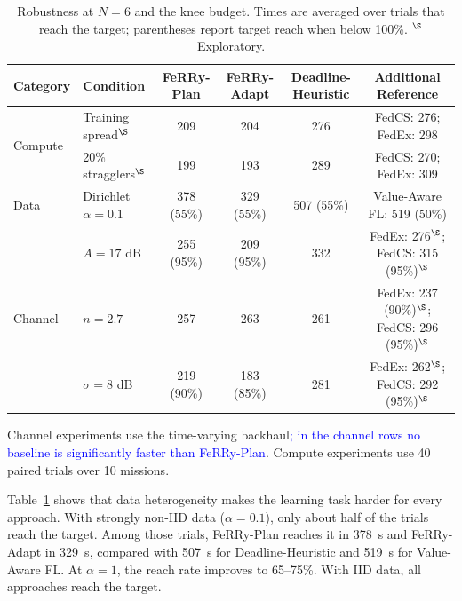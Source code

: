 \documentclass[conference]{IEEEtran}
\newcommand{\sysname}{FeRRy}
\begin{document}
\begin{table}[t]
\centering
\caption{Robustness at \(N=6\) and the knee budget. Times are averaged over
trials that reach the target; parentheses report target reach when below
100\%. \(^{\S}\) Exploratory.}
\label{tab:robustness}
\small
\setlength{\tabcolsep}{5pt}

\begin{tabular}{llcccc}
\hline
\textbf{Category} &
\textbf{Condition} &
\textbf{\sysname{}-Plan} &
\textbf{\sysname{}-Adapt} &
\textbf{Deadline-Heuristic} &
\textbf{Additional Reference} \\
\hline

\multirow{2}{*}{Compute}
& Training spread$^{\S}$
& 209
& 204
& 276
& FedCS: 276; FedEx: 298 \\

& 20\% stragglers$^{\S}$
& 199
& 193
& 289
& FedCS: 270; FedEx: 309 \\
\hline

Data
& Dirichlet \(\alpha=0.1\)
& 378 (55\%)
& 329 (55\%)
& 507 (55\%)
& Value-Aware FL: 519 (50\%) \\
\hline

\multirow{3}{*}{Channel}
& \(A=17\) dB
& 255 (95\%)
& 209 (95\%)
& 332
& FedEx: 276$^{\S}$; FedCS: 315 (95\%)$^{\S}$ \\

& \(n=2.7\)
& 257
& 263
& 261
& FedEx: 237 (90\%)$^{\S}$; FedCS: 296 (95\%)$^{\S}$ \\

& \(\sigma=8\) dB
& 219 (90\%)
& 183 (85\%)
& 281
& FedEx: 262$^{\S}$; FedCS: 292 (95\%)$^{\S}$ \\
\hline
\end{tabular}

\vspace{2pt}
\footnotesize
Channel experiments use the time-varying backhaul\textcolor{blue}{; in the channel
rows no baseline is significantly faster than \sysname{}-Plan}. Compute experiments use
40 paired trials over 10 missions.
\end{table}

Table~\ref{tab:robustness} shows that data heterogeneity makes the learning task
harder for every approach. With strongly non-IID data
(\(\alpha=0.1\)), only about half of the trials reach the target. Among those
trials, \sysname{}-Plan reaches it in 378~s and \sysname{}-Adapt in 329~s,
compared with 507~s for Deadline-Heuristic and 519~s for Value-Aware FL.
At \(\alpha=1\), the reach rate improves to 65--75\%. With IID data, all
approaches reach the target.
\end{document}
